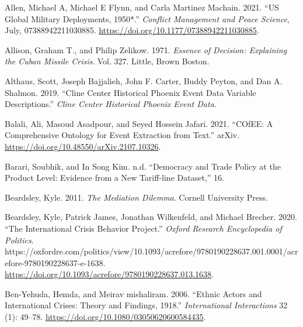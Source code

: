 \documentclass{article}
\newlength{\cslhangindent}
\newlength{\cslentryspacingunit} %
\newenvironment{CSLReferences}[2] %
 {%
  \setlength{\parindent}{0pt}
  \ifodd #1
  \let\oldpar\par
  \def\par{\hangindent=\cslhangindent\oldpar}
  \fi
  \setlength{\parskip}{#2\cslentryspacingunit}
 }%
 {}
\begin{document}
\hypertarget{refs}{}
\begin{CSLReferences}{1}{0}
\leavevmode{}%
Allen, Michael A, Michael E Flynn, and Carla Martinez Machain. 2021.
{``{US} Global Military Deployments, 1950*.''}
\emph{Conflict Management and Peace Science}, July, 07388942211030885.
\url{https://doi.org/10.1177/07388942211030885}.

\leavevmode{}%
Allison, Graham T., and Philip Zelikow. 1971. \emph{Essence of Decision:
{Explaining} the {Cuban} Missile Crisis}. Vol. 327. {Little, Brown
Boston}.

\leavevmode{}%
Althaus, Scott, Joseph Bajjalieh, John F. Carter, Buddy Peyton, and Dan
A. Shalmon. 2019. {``Cline {Center Historical Phoenix Event Data
Variable Descriptions}.''} \emph{Cline Center Historical Phoenix Event
Data}.

\leavevmode{}%
Balali, Ali, Masoud Asadpour, and Seyed Hossein Jafari. 2021.
{``{COfEE}: {A Comprehensive Ontology} for {Event Extraction} from
Text.''} {arXiv}. \url{https://doi.org/10.48550/arXiv.2107.10326}.

\leavevmode{}%
Barari, Soubhik, and In Song Kim. n.d. {``Democracy and {Trade Policy}
at the {Product Level}: {Evidence} from a {New Tariff-line Dataset},''}
16.

\leavevmode{}%
Beardsley, Kyle. 2011. \emph{The Mediation Dilemma}. {Cornell University
Press}.

\leavevmode{}%
Beardsley, Kyle, Patrick James, Jonathan Wilkenfeld, and Michael
Brecher. 2020. {``The {International Crisis Behavior Project}.''}
\emph{Oxford Research Encyclopedia of Politics}.
https://oxfordre.com/politics/view/10.1093/acrefore/9780190228637.001.0001/acrefore-9780190228637-e-1638.
\url{https://doi.org/10.1093/acrefore/9780190228637.013.1638}.

\leavevmode{}%
Ben-Yehuda, Hemda, and Meirav mishaliram. 2006. {``Ethnic {Actors} and
{International Crises}: {Theory} and {Findings},
1918.''} \emph{International Interactions} 32 (1):
49--78. \url{https://doi.org/10.1080/03050620600584435}.


\end{CSLReferences}
\end{document}
